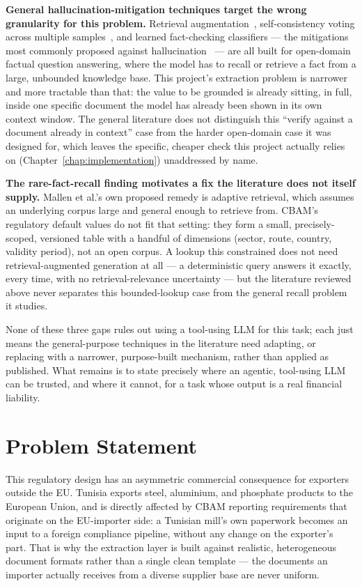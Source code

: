 \textbf{General hallucination-mitigation techniques target the wrong
granularity for this problem.} Retrieval
augmentation~\cite{lewis2020rag}, self-consistency voting across multiple
samples~\cite{wang2023selfconsistency}, and learned fact-checking
classifiers --- the mitigations most commonly proposed against
hallucination~\cite{huang2023hallucination} --- are all built for open-domain factual question
answering, where the model has to recall or retrieve a fact from a
large, unbounded knowledge base. This project's extraction problem is
narrower and more tractable than that: the value to be grounded is
already sitting, in full, inside one specific document the model has
already been shown in its own context window. The general literature
does not distinguish this ``verify against a document already in
context'' case from the harder open-domain case it was designed for,
which leaves the specific, cheaper check this project actually relies on
(Chapter~\ref{chap:implementation}) unaddressed by name.

\textbf{The rare-fact-recall finding motivates a fix the literature does
not itself supply.} Mallen et al.'s own proposed remedy is adaptive
retrieval, which assumes an underlying corpus large and general enough to
retrieve from. CBAM's regulatory default values do not fit that setting:
they form a small, precisely-scoped, versioned table with a handful of
dimensions (sector, route, country, validity period), not an open corpus.
A lookup this constrained does not need retrieval-augmented generation at
all --- a deterministic query answers it exactly, every time, with no
retrieval-relevance uncertainty --- but the literature reviewed above
never separates this bounded-lookup case from the general recall problem
it studies.

None of these three gaps rules out using a tool-using LLM for this task;
each just means the general-purpose techniques in the literature need
adapting, or replacing with a narrower, purpose-built mechanism, rather
than applied as published. What remains is to state precisely where an
agentic, tool-using LLM can be trusted, and where it cannot, for a task
whose output is a real financial liability.

\section{Problem Statement}

This regulatory design has an asymmetric commercial consequence for
exporters outside the EU. Tunisia exports steel, aluminium, and phosphate
products to the European Union, and is directly affected by CBAM
reporting requirements that originate on the EU-importer side: a
Tunisian mill's own paperwork becomes an input to a foreign compliance
pipeline, without any change on the exporter's part. That is why the
extraction layer is built against realistic, heterogeneous document
formats rather than a single clean template --- the documents an
importer actually receives from a diverse supplier base are never
uniform.

